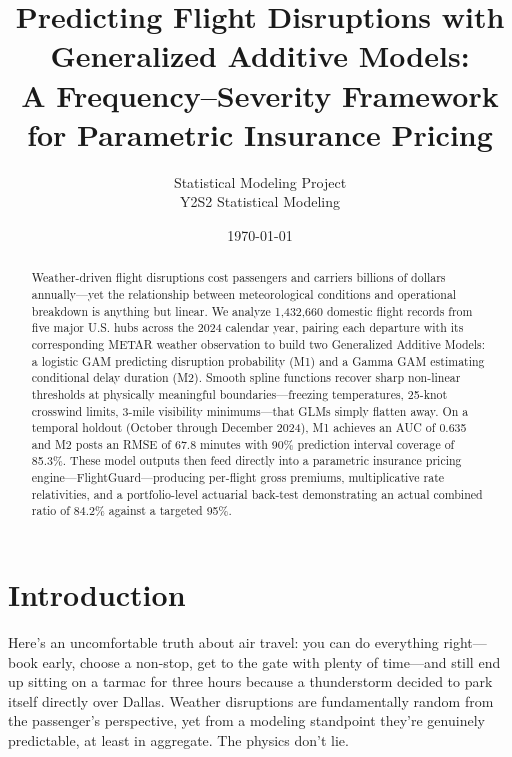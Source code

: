 \documentclass[12pt, a4paper]{article}
\title{\textbf{Predicting Flight Disruptions with Generalized Additive Models:\\
\large A Frequency--Severity Framework for Parametric Insurance Pricing}}
\author{Statistical Modeling Project\\
\small Y2S2 Statistical Modeling}
\date{\today}
\begin{document}
\maketitle
\thispagestyle{empty}

\vspace{-1.5em}
\begin{abstract}
\noindent
Weather-driven flight disruptions cost passengers and carriers billions of dollars annually---yet the relationship between meteorological conditions and operational breakdown is anything but linear. We analyze 1,432,660 domestic flight records from five major U.S. hubs across the 2024 calendar year, pairing each departure with its corresponding METAR weather observation to build two Generalized Additive Models: a logistic GAM predicting disruption probability (M1) and a Gamma GAM estimating conditional delay duration (M2). Smooth spline functions recover sharp non-linear thresholds at physically meaningful boundaries---freezing temperatures, 25-knot crosswind limits, 3-mile visibility minimums---that GLMs simply flatten away. On a temporal holdout (October through December 2024), M1 achieves an AUC of 0.635 and M2 posts an RMSE of 67.8 minutes with 90\% prediction interval coverage of 85.3\%. These model outputs then feed directly into a parametric insurance pricing engine---FlightGuard---producing per-flight gross premiums, multiplicative rate relativities, and a portfolio-level actuarial back-test demonstrating an actual combined ratio of 84.2\% against a targeted 95\%.
\end{abstract}

\vspace{1em}
\onehalfspacing

\section{Introduction}
\label{sec:intro}

Here's an uncomfortable truth about air travel: you can do everything right---book early, choose a non-stop, get to the gate with plenty of time---and still end up sitting on a tarmac for three hours because a thunderstorm decided to park itself directly over Dallas. Weather disruptions are fundamentally random from the passenger's perspective, yet from a modeling standpoint they're genuinely predictable, at least in aggregate. The physics don't lie.
\end{document}
